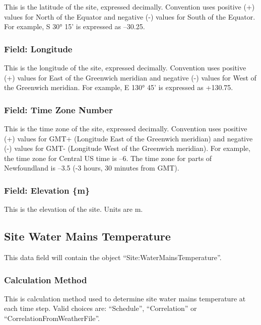 This is the latitude of the site, expressed decimally. Convention uses positive (+) values for North of the Equator and negative (-) values for South of the Equator. For example, S 30° 15' is expressed as --30.25.

\subsubsection{Field: Longitude}\label{field-longitude}

This is the longitude of the site, expressed decimally. Convention uses positive (+) values for East of the Greenwich meridian and negative (-) values for West of the Greenwich meridian. For example, E 130° 45' is expressed as +130.75.

\subsubsection{Field: Time Zone Number}\label{field-time-zone-number}

This is the time zone of the site, expressed decimally. Convention uses positive (+) values for GMT+ (Longitude East of the Greenwich meridian) and negative (-) values for GMT- (Longitude West of the Greenwich meridian). For example, the time zone for Central US time is --6. The time zone for parts of Newfoundland is --3.5 (-3 hours, 30 minutes from GMT).

\subsubsection{Field: Elevation \{m\}}\label{field-elevation-m}

This is the elevation of the site. Units are m.

\subsection{Site Water Mains Temperature}\label{site-water-mains-temperature}

This data field will contain the object ``Site:WaterMainsTemperature''.

\subsubsection{Calculation Method}\label{calculation-method}

This is calculation method used to determine site water mains temperature at each time step. Valid choices are: ``Schedule'', ``Correlation'' or ``CorrelationFromWeatherFile''.


